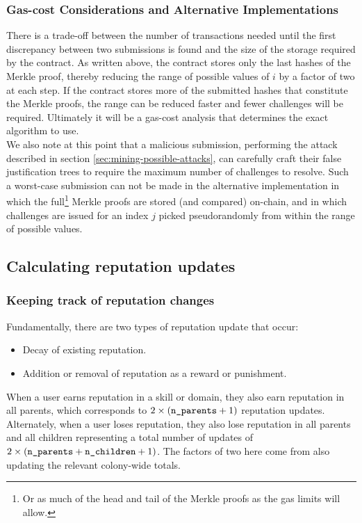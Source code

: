 \subsubsection*{Gas-cost Considerations and Alternative Implementations}
There is a trade-off between the number of transactions needed until the first discrepancy between two submissions is found and the size of the storage required by the contract. As written above, the contract stores only the last hashes of the Merkle proof, thereby reducing the range of possible values of $i$ by a factor of two at each step. If the contract stores more of the submitted hashes that constitute the Merkle proofs, the range can be reduced faster and fewer challenges will be required. Ultimately it will be a gas-cost analysis that determines the exact algorithm to use.\\
We also note at this point that a malicious submission, performing the attack described in section \ref{sec:mining-possible-attacks}, can carefully craft their false justification trees to require the maximum number of challenges to resolve. Such a worst-case submission can not be made in the alternative implementation in which the full\footnote{Or as much of the head and tail of the Merkle proofs as the gas limits will allow.} Merkle proofs are stored (and compared) on-chain, and in which challenges are issued for an index $j$ picked pseudorandomly from within the range of possible values.

\subsection{Calculating reputation updates}\label{sec:calculating-reputation-updates}
%
\subsubsection{Keeping track of reputation changes}
%
Fundamentally, there are two types of reputation update that occur:
\begin{itemize}
 \item Decay of existing reputation.
 \item Addition or removal of reputation as a reward or punishment.
\end{itemize}

When a user earns reputation in a skill or domain, they also earn reputation in all parents, which corresponds to $2\times\left(\texttt{n\_parents}+1\right)$ reputation updates. Alternately, when a user loses reputation, they also lose reputation in all parents and all children representing a total number of updates of $2\times\left(\texttt{n\_parents} + \texttt{n\_children} + 1\right)$. The factors of two here come from also updating the relevant colony-wide totals.

